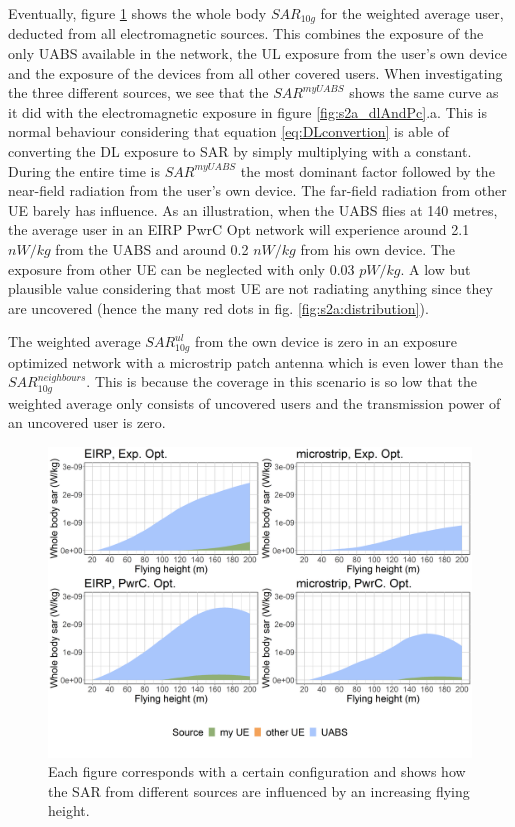 \FloatBarrier
Eventually, figure \ref{fig:s2shfourSourcesMatrix} shows the whole body $SAR_{10g}$ for the weighted average user, deducted from all electromagnetic sources. 
This combines the exposure 
of the only \gls{UABS} available in the network, 
the \gls{UL} exposure from the user’s own device and the exposure of the devices from all other covered users. 
When investigating the three different sources, we see 
that the $SAR^{myUABS}$ shows the same curve as it did with the electromagnetic exposure 
in figure \ref{fig:s2a_dlAndPc}.a. This is normal behaviour considering that equation \ref{eq:DLconvertion} is able of 
converting the \gls{DL} exposure to \gls{SAR} by simply multiplying with a constant.
During the entire time is $SAR^{myUABS}$ the most dominant factor followed by 
 the near-field radiation from the user's own device.
The far-field radiation from other \gls{UE} barely has influence. 
As an illustration, when the \gls{UABS} flies at 140 metres, the average user in an \gls{EIRP} \gls{PwrC Opt} network will 
experience around  2.1 $nW/kg$ from the \gls{UABS} and around 0.2 $nW/kg$ from his own device.
The exposure from other \gls{UE} can be neglected with only 0.03 $pW/kg$. A low but plausible value considering that most 
\gls{UE} are not radiating anything since they are uncovered (hence the many red dots in fig. \ref{fig:s2a:distribution}).

The weighted average $SAR^{ul}_{10g}$ from the own device is zero in an exposure optimized network with a microstrip patch antenna 
which is even lower than the $SAR^{neighbours}_{10g}$.
This is because the coverage in this scenario is so low that the weighted average 
only consists of uncovered users and the transmission power of an uncovered user is zero.

\begin{figure}[h!]
  \includegraphics[width=\textwidth]{../results/s2/fhFourSources.png}
  \caption{Each figure corresponds with a certain configuration and shows how the \acs{SAR} from 
  different sources are influenced by an increasing flying height.}
  \label{fig:s2shfourSourcesMatrix}
\end{figure}

